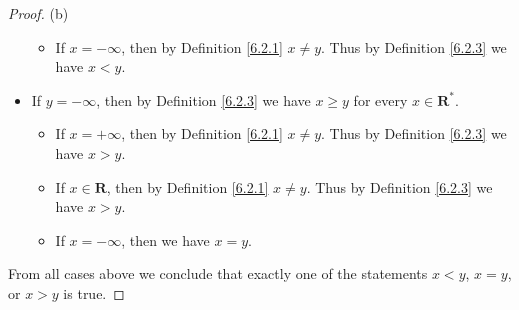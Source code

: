 \begin{proof}{(b)}
\begin{itemize}
\begin{itemize}
                        \item If \(x = -\infty\), then by Definition \ref{6.2.1} \(x \neq y\).
                              Thus by Definition \ref{6.2.3} we have \(x < y\).
                  \end{itemize}
            \item If \(y = -\infty\), then by Definition \ref{6.2.3} we have \(x \geq y\) for every \(x \in \mathbf{R}^*\).
                  \begin{itemize}
                        \item If \(x = +\infty\), then by Definition \ref{6.2.1} \(x \neq y\).
                              Thus by Definition \ref{6.2.3} we have \(x > y\).
                        \item If \(x \in \mathbf{R}\), then by Definition \ref{6.2.1} \(x \neq y\).
                              Thus by Definition \ref{6.2.3} we have \(x > y\).
                        \item If \(x = -\infty\), then we have \(x = y\).
                  \end{itemize}
      \end{itemize}
      From all cases above we conclude that exactly one of the statements \(x < y\), \(x = y\), or \(x > y\) is true.
\end{proof}


